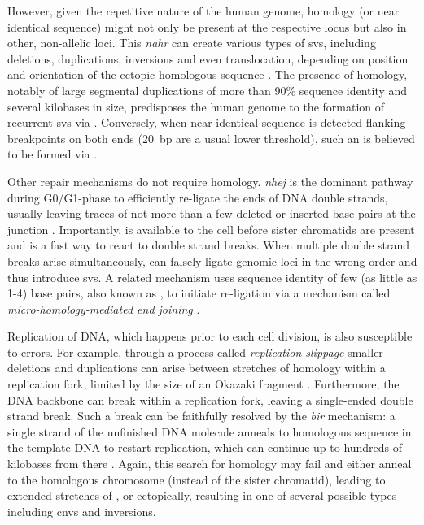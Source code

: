However, given the repetitive nature of
the human genome, homology (or near identical sequence) might not only be present at the
respective locus but also in other, non-allelic loci. This \emph{\acf{nahr}}
can create various types of \acp{sv}, including deletions, duplications,
inversions and even translocation, depending on position and orientation of the
ectopic homologous sequence \citep{Carvalho2016}. The presence of homology,
notably of large segmental duplications of more than 90\% sequence identity and
several kilobases in size, predisposes the human genome to the formation of
recurrent \acp{sv} via \nahr \citep{Carvalho2016}. Conversely, when
near identical sequence is detected flanking \sv breakpoints on both ends
(20~bp are a usual lower threshold), such an \sv is believed to be formed via
\nahr \citep{Onishi-Seebacher2011}.

Other repair mechanisms do not require homology. \emph{\Acf{nhej}} is the
dominant pathway during G0/G1-phase to efficiently re-ligate the ends of DNA
double strands, usually leaving traces of not more than a few deleted or
inserted base pairs at the junction \citep{Lieber2008}. Importantly, \nhej is
available to the cell before sister chromatids are present and is a fast way to
react to double strand breaks. When multiple double strand breaks arise
simultaneously, \nhej can falsely ligate genomic loci in the wrong order and
thus introduce \acp{sv}. A related mechanism uses sequence identity of few
(as little as 1-4) base pairs, also known as , to initiate re-ligation via a
mechanism called \emph{micro-homology-mediated end joining} \citep{Hastings2009}.

Replication of DNA, which happens prior to each cell division, is also
susceptible to errors. For example, through a process called \textit{replication
slippage} smaller deletions and duplications can arise between stretches of
homology within a replication fork, limited by the size of an Okazaki fragment
\citep{Hastings2009}. Furthermore, the DNA backbone can break within a
replication fork, leaving a single-ended double strand break. Such a break can
be faithfully resolved by the \emph{\acf{bir}} mechanism: a single strand of the
unfinished DNA molecule anneals to homologous sequence in the template DNA to
restart replication, which can continue up to hundreds of kilobases from there
\citep{Carvalho2016}. Again, this search for homology may fail and either anneal
to the homologous chromosome (instead of the sister chromatid), leading to
extended stretch\-es of \loh, or ectopically, resulting in one of several possible
\sv types including \acp{cnv} and inversions.

